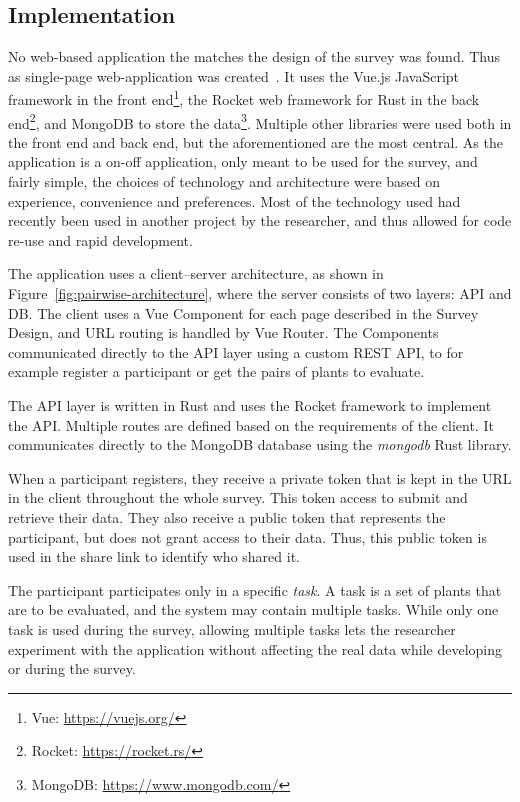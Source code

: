 \subsection{Implementation}
No web-based application the matches the design of the survey was found.
Thus as single-page web-application was created~\cite{CodePairwise}.
It uses the Vue.js JavaScript framework in the front end\footnote{Vue: \url{https://vuejs.org/}}, the Rocket web framework for Rust in the back end\footnote{Rocket: \url{https://rocket.rs/}}, and MongoDB to store the data\footnote{MongoDB: \url{https://www.mongodb.com/}}.
Multiple other libraries were used both in the front end and back end, but the aforementioned are the most central.
As the application is a on-off application, only meant to be used for the survey, and fairly simple, the choices of technology and architecture were based on experience, convenience and preferences.
Most of the technology used had recently been used in another project by the researcher, and thus allowed for code re-use and rapid development.

The application uses a client--server architecture, as shown in Figure~\ref{fig:pairwise-architecture}, where the server consists of two layers: API and DB.
The client uses a Vue Component for each page described in the Survey Design, and URL routing is handled by Vue Router.
The Components communicated directly to the API layer using a custom REST API, to for example register a participant or get the pairs of plants to evaluate.

The API layer is written in Rust and uses the Rocket framework to implement the API.
Multiple routes are defined based on the requirements of the client.
It communicates directly to the MongoDB database using the \textit{mongodb} Rust library.

When a participant registers, they receive a private token that is kept in the URL in the client throughout the whole survey.
This token access to submit and retrieve their data.
They also receive a public token that represents the participant, but does not grant access to their data.
Thus, this public token is used in the share link to identify who shared it.

The participant participates only in a specific \textit{task}.
A task is a set of plants that are to be evaluated, and the system may contain multiple tasks.
While only one task is used during the survey, allowing multiple tasks lets the researcher experiment with the application without affecting the real data while developing or during the survey.

